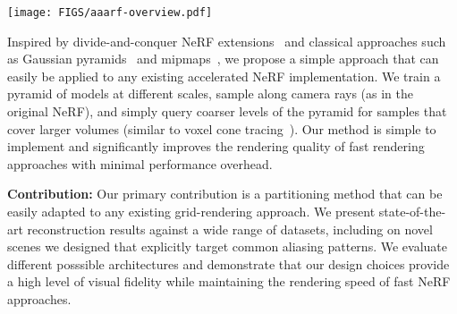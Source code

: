 \documentclass{article}
\newcommand{\method}{PyNeRF\xspace}
\begin{document}
\begin{figure*}[t!]
\texttt{[image: FIGS/aaarf-overview.pdf]}
\caption{{\bf Comparison of methods.}
\textbf{(a)} NeRF traces a ray from the camera's center of projection through each pixel and samples points $\mathbf{x}$ along each ray. Sample locations are then encoded with a positional encoding to produce a feature $\gamma(\mathbf{x})$ that is fed into an MLP.
\textbf{(b)} Mip-NeRF instead reasons about \textit{volumes} by defining a 3D conical frustum per camera pixel. It splits the frustum into sampled volumes, approximates them as multivariate Gaussians, and computes the integral of the positional encodings of the coordinates contained within the Gaussians. Similar to NeRF, these features are then fed into an MLP.
\textbf{(c)} Accelerated grid methods, such as iNGP, sample points as in NeRF, but do not use positional encoding and instead featurize each point by interpolating between vertices in a feature grid. These features are then passed into a much smaller MLP, which greatly accelerates training and rendering.
\textbf{(d)} \method also uses feature grids, but reasons about volumes by training separate models at different scales (similar to a mipmap). It calculates the area covered by each sample in world coordinates, queries the models at the closest corresponding resolutions, and interpolates their outputs.
}
  \label{fig:architecture}
\end{figure*}

Inspired by divide-and-conquer NeRF extensions~\cite{derf, reiser2021kilonerf, Turki_2022_CVPR, tancik2022blocknerf} and classical approaches such as Gaussian pyramids~\cite{gaussian_pyramids} and mipmaps~\cite{mipmaps}, we propose a simple approach that can easily be applied to any existing accelerated NeRF implementation. We train a pyramid of models at different scales, sample along camera rays (as in the original NeRF), and simply query coarser levels of the pyramid for samples that cover larger volumes (similar to voxel cone tracing~\cite{voxel-cone-tracing}). Our method is simple to implement and significantly improves the rendering quality of fast rendering approaches with minimal performance overhead.

\textbf{Contribution:} Our primary contribution is a partitioning method that can be easily adapted to any existing grid-rendering approach. We present state-of-the-art reconstruction results against a wide range of datasets, including on novel scenes we designed that explicitly target common aliasing patterns. We evaluate different posssible architectures and demonstrate that our design choices provide a high level of visual fidelity while maintaining the rendering speed of fast NeRF approaches.
\end{document}

